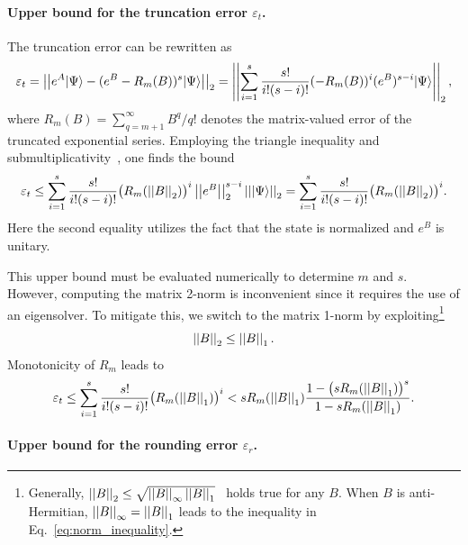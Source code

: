 \paragraph{Upper bound for the truncation error \texorpdfstring{$\varepsilon_t$}{epsilon\_t}.}
The truncation error can be rewritten as
\begin{equation}
    \varepsilon_t = \left|\left|e^A|\Psi\rangle-(e^B-R_m(B))^s|\Psi\rangle\right|\right|_2=  \left|\left|\sum_{i=1}^{s}\frac{s!}{i!(s-i)!} (-R_m(B))^i(e^B)^{s-i}|\Psi\rangle\right|\right|_2,
\end{equation}
where $R_m(B)=\sum_{q=m+1}^{\infty}B^q/q!$ denotes the matrix-valued error of the truncated exponential series.
Employing the triangle inequality and submultiplicativity~\cite{higham2002accuracy}, one finds the bound
\begin{equation}
    \varepsilon_t \leq 
    \sum_{i=1}^{s}\frac{s!}{i!(s-i)!}\big(R_m(\left|\left|B\right|\right|_2)\big)^i\left|\left|e^B\right|\right|_2^{s-i}\left|\left||\Psi\rangle\right|\right|_2=\sum_{i=1}^{s}\frac{s!}{i!(s-i)!}\big(R_m(\left|\left|B\right|\right|_2)\big)^i.
\end{equation}
Here the second equality utilizes the fact that the state is normalized and $e^B$ is unitary. 

This upper bound must be evaluated numerically to determine $m$ and $s$. However, computing the matrix 2-norm is inconvenient since it requires the use of an eigensolver. To mitigate this, we switch to the matrix 1-norm by exploiting\footnote{Generally, $\left|\left|B\right|\right|_2\leq\sqrt{\left|\left|B\right|\right|_\infty\left|\left|B\right|\right|_1}$~\cite{wilkinson1994rounding} holds true for any $B$. When $B$ is anti-Hermitian, $\left|\left|B\right|\right|_\infty=\left|\left|B\right|\right|_1$ leads to the inequality in Eq.~\eqref{eq:norm_inequality}.}
\begin{equation}
\label{eq:norm_inequality}
    \left|\left|B\right|\right|_2\leq\left|\left|B\right|\right|_1.
\end{equation}
Monotonicity of $R_m$ leads to
\begin{equation}
    \label{eq:truncation}
    \varepsilon_t \leq 
    \sum_{i=1}^{s}\frac{s!}{i!(s-i)!}\big(R_m(\left|\left|B\right|\right|_1)\big)^i
    < sR_m(\left|\left|B\right|\right|_1)\frac{1-\big(sR_m(\left|\left|B\right|\right|_1)\big)^s}{1-sR_m(\left|\left|B\right|\right|_1)}.
\end{equation}


\paragraph{Upper bound for the rounding error \texorpdfstring{$\varepsilon_r$}{epsilon\_r}.}
\label{par:rounding_error}

